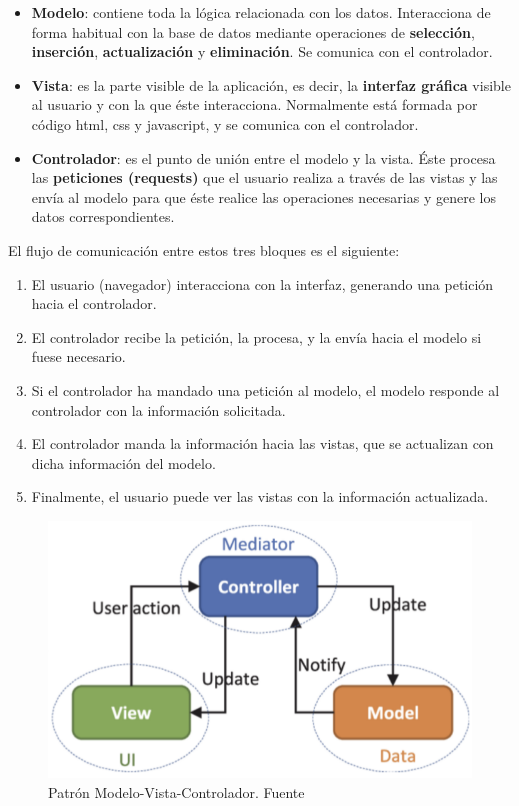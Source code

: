     \begin{itemize}
        \item \textbf{Modelo}: contiene toda la lógica relacionada con los datos.
        Interacciona de forma habitual con la base de datos mediante operaciones de
        \textbf{selección}, \textbf{inserción}, \textbf{actualización} y \textbf{eliminación}.
        Se comunica con el controlador.
        \item \textbf{Vista}: es la parte visible de la aplicación, es decir, la 
        \textbf{interfaz gráfica} visible al usuario y con la que éste interacciona.
        Normalmente está formada por código html, css y javascript, y se comunica con el
        controlador.
        \item \textbf{Controlador}: es el punto de unión entre el modelo y la vista. Éste
        procesa las \textbf{peticiones (requests)} que el usuario realiza a través de las
        vistas y las envía al modelo para que éste realice las operaciones necesarias y
        genere los datos correspondientes.
    \end{itemize}

El flujo de comunicación entre estos tres bloques es el siguiente:

    \begin{enumerate}
        \item El usuario (navegador) interacciona con la interfaz, generando una petición
        hacia el controlador.
        \item El controlador recibe la petición, la procesa, y la envía hacia el modelo
        si fuese necesario.
        \item Si el controlador ha mandado una petición al modelo, el modelo responde al
        controlador con la información solicitada. 
        \item El controlador manda la información hacia las vistas, que se actualizan con
        dicha información del modelo.
        \item Finalmente, el usuario puede ver las vistas con la información actualizada.
    \end{enumerate}

    \begin{figure}[H]
        \centering
        \includegraphics[scale=0.50]{imagenes/mvc.png}
        \caption[Patrón Modelo-Vista-Controlador]{Patrón Modelo-Vista-Controlador. Fuente \cite{mvc}}
        \label{fig:mvc}
    \end{figure}

